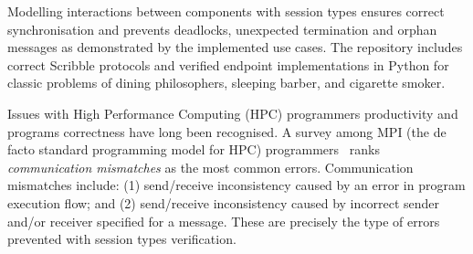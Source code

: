 
Modelling interactions between components with session types ensures
correct synchronisation and prevents deadlocks,
unexpected termination and orphan messages as demonstrated by the implemented use cases.
The repository includes correct Scribble protocols and verified endpoint implementations in Python
for classic problems of dining philosophers, sleeping barber, and
cigarette smoker.
%




Issues with High Performance Computing (HPC)
programmers productivity and programs correctness
have long been recognised.
A survey among MPI (the de facto standard programming model for HPC)
programmers~\cite{MPIErrors} ranks
\textit{communication mismatches} as the most common errors.
Communication mismatches include:
(1) send/receive inconsistency caused by an error in
program execution flow; and
(2) send/receive inconsistency caused by incorrect
sender and/or receiver specified for a message.
These are precisely the type of errors prevented with
session types verification.

